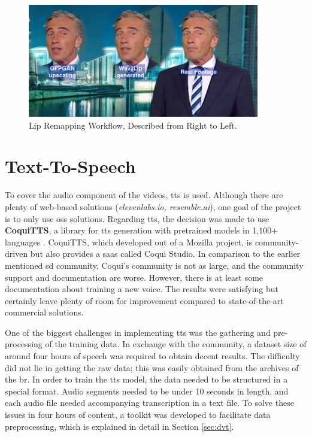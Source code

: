 \documentclass[
  a4paper,  %
  twoside,  %
  bibliography=totoc,
  headsepline,
  cleardoublepage=empty,
  parskip=half,
  draft=false
]{scrbook}
\begin{document}
\begin{figure}[h]
  \centering
  \includegraphics[width=0.9\textwidth]{./graphics/wav2lip/wav2lip-demo.png}
  \caption{Lip Remapping Workflow, Described from Right to Left.}
  \label{fig:wav2lip-demo}
\end{figure}

\section{Text-To-Speech}
\label{sec:tts}
To cover the audio component of the videos, \gls{tts} is used. Although there are plenty of web-based solutions (\textit{elevenlabs.io, resemble.ai}), one goal of the project is to only use \gls{oss} solutions. Regarding \gls*{tts}, the decision was made to use \textbf{CoquiTTS}, a library for \gls{tts} generation with pretrained models in 1,100+ languages \cite{erenCoquiTTS2021}. CoquiTTS, which developed out of a Mozilla project, is community-driven but also provides a \gls{saas} called Coqui Studio. In comparison to the earlier mentioned \gls{sd} community, Coqui's community is not as large, and the community support and documentation are worse. However, there is at least some documentation about training a new voice. The results were satisfying but certainly leave plenty of room for improvement compared to state-of-the-art commercial solutions.

One of the biggest challenges in implementing \gls{tts} was the gathering and pre-processing of the training data. In exchange with the community, a dataset size of around four hours of speech was required to obtain decent results. The difficulty did not lie in getting the raw data; this was easily obtained from the archives of the \gls{br}. In order to train the \gls{tts} model, the data needed to be structured in a special format. Audio segments needed to be under 10 seconds in length, and each audio file needed accompanying transcription in a text file. To solve these issues in four hours of content, a toolkit was developed to facilitate data preprocessing, which is explained in detail in Section \ref{sec:dvt}.
\end{document}
